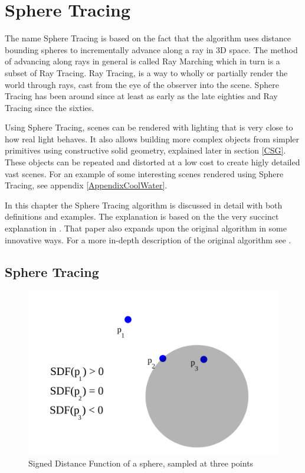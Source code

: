 \chapter{Sphere Tracing} \label{spheretracing}

	The name Sphere Tracing\cite{Hart1996} is based on the fact that the algorithm uses
	distance bounding spheres to incrementally advance along a ray in 3D space.
	The method of advancing along rays in general is called Ray Marching which in
	turn is a subset of Ray Tracing\cite{Whitted1980a}. Ray Tracing, is a way to
	wholly or partially render the world through rays, cast from the eye of the
	observer into the scene\cite{PeterShirleyMichaelAshikhmin2005}. Sphere
	Tracing has been around since at least as early as the late
	eighties\cite{Hart1989} and Ray Tracing since the sixties\cite{Appel1968}.

	Using Sphere Tracing, scenes can be rendered with lighting that is very close
	to how real light behaves. It also allows building more complex objects from
	simpler primitives using constructive solid geometry, explained later in
	section \ref{CSG}. These objects can be repeated and distorted at a low cost
	to create higly detailed vast scenes. For an example of some interesting
	scenes rendered using Sphere Tracing, see appendix \ref{AppendixCoolWater}.

	In this chapter the Sphere Tracing algorithm is discussed in detail with
	both definitions and examples. The explanation is based on the the very
	succinct explanation in \cite{Korndorfer2014}. That paper also expands upon
	the original algorithm in some innovative ways. For a more in-depth
	description of the original algorithm see \cite{Hart1996}.

	\section{Sphere Tracing} 

		\begin{figure}
			\includegraphics[width=0.75\linewidth]{figure/SDF} 
			\caption{Signed Distance Function of a sphere, sampled at three 
				points}
		\end{figure}

